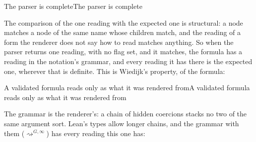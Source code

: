 \documentclass[acmsmall,screen,review,anonymous,nonacm]{acmart}
\begin{document}
\begin{leantheorem}[sum=r9iGVIC4-b]{The parser is complete}{The parser is complete}
\label{thm:The-parser-is-complete}
\LeanProse{Let $\mathcal{S} \in \texttt{Sorts}$, $G \in \texttt{Grammar}$, $\mathit{ts} \in \mathsf{Array}(\mathit{String})$, $s \in \mathit{String}$, $\mathit{rd} \in \texttt{Reading}$ and $\sigma \in \mathit{String}$. Assume $\mathsf{flagged}_{\mathcal{S}}(G, \mathit{ts}, s) = \mathsf{false}$ and $\mathit{ts}[0, |\mathit{ts}|) \rightsquigarrow^{G}_{\mathcal{S}}(s, 0, \mathsf{none}, \mathsf{top}_{G})\ \mathit{rd} : \sigma$. Then $\mathit{rd} \in \mathsf{readings}_{\mathcal{S}}(G, \mathit{ts}, s)$.}
\end{leantheorem}

The comparison of the one reading with the expected one is structural:
a node matches a node of the same name whose children match, and the
reading of a form the renderer does not say how to read matches anything.
So when the parser returns one reading, with no flag set, and it matches,
the formula has a reading in the notation's grammar, and every reading it
has there is the expected one, wherever that is definite. This is
Wiedijk's property, of the formula:

\begin{leantheorem}[sum=59pefHlXpg]{A validated formula reads only as what it was rendered from}{A validated formula reads only as what it was rendered from}
\label{thm:A-validated-formula-reads-only-as-what-it-was-rendered-from}
\LeanProse{Let $\mathcal{S} \in \texttt{Sorts}$, $G \in \texttt{Grammar}$, $\mathit{ts} \in \mathsf{Array}(\mathit{String})$, $s \in \mathit{String}$ and $\mathit{ex}, \mathit{rd} \in \texttt{Reading}$. Assume $\mathsf{readings}_{\mathcal{S}}(G, \mathit{ts}, s) = [\mathit{rd}]$, $\mathsf{flagged}_{\mathcal{S}}(G, \mathit{ts}, s) = \mathsf{false}$ and $\mathsf{matches}(\mathit{ex}, \mathit{rd}) = \mathsf{true}$. Then (1)~$\exists \sigma,\ \mathit{ts}[0, |\mathit{ts}|) \rightsquigarrow^{G}_{\mathcal{S}}(s, 0, \mathsf{none}, \mathsf{top}_{G})\ \mathit{rd} : \sigma$ and (2)~$\forall \mathit{rd}' : \texttt{Reading},\ \forall \sigma : \mathit{String},\ \mathit{ts}[0, |\mathit{ts}|) \rightsquigarrow^{G}_{\mathcal{S}}(s, 0, \mathsf{none}, \mathsf{top}_{G})\ \mathit{rd}' : \sigma \implies \mathit{ex} \succcurlyeq \mathit{rd}'$.}
\end{leantheorem}

The grammar is the renderer's: a chain of hidden coercions stacks no two
of the same argument sort. Lean's types allow longer chains, and the
grammar with them ($\rightsquigarrow^{G,\infty}$) has every reading this
one has:
\end{document}

